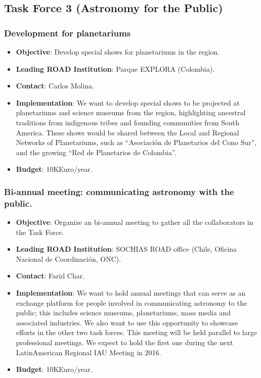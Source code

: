 \documentclass[12pt]{article}
\begin{document}
\subsection{Task Force 3 (Astronomy for the Public)}


\subsubsection{Development for planetariums}
\begin{itemize}
\item {\bf Objective}: Develop special shows for planetariums in the
  region. 
\item {\bf Leading ROAD Institution}: Parque EXPLORA (Colombia).
\item {\bf Contact}: Carlos Molina.
\item {\bf Implementation}: We want to develop special shows to be projected
  at planetariums and science museums from the region, highlighting
  ancestral traditions from indigenous tribes and founding communities
  from South America. These shows would be shared between the Local
  and Regional Networks of Planetariums, such as “Asociación de
  Planetarios del Cono Sur”, and the growing “Red de Planetarios de
  Colombia”.   
\item {\bf Budget}: 10KEuro/year.
\end{itemize}


\subsubsection{Bi-annual meeting: communicating astronomy with the
  public.}
\begin{itemize}
\item {\bf Objective}: Organize an bi-annual meeting to gather all the
  collaborators in the Task Force.
\item {\bf Leading ROAD Institution}: SOCHIAS ROAD office
 (Chile, Oficina
  Nacional de Coordinaci\'on, ONC).
\item {\bf Contact}: Farid Char.
\item {\bf Implementation}: We want to hold annual meetings that can
  serve as an exchange platform for people involved in communicating
  astronomy to the public; this includes science museums,
  planetariums, mass media and associated industries. We also want to use
  this opportunity to showcase efforts in the other two task
  forces. This meeting will be held parallel to large professional
  meetings. We expect to hold the first one during the next LatinAmerican
  Regional IAU Meeting in 2016. 
\item {\bf Budget}: 10KEuro/year.
\end{itemize}
\end{document}
